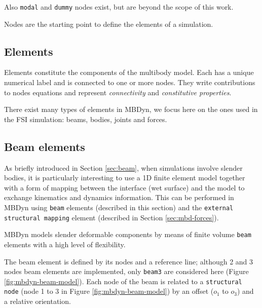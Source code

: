 Also \texttt{modal} and \texttt{dummy} nodes exist, but are beyond the scope of this work.

Nodes are the starting point to define the elements of a simulation.


\subsection{Elements}
\label{sec:mbd-elem}

Elements constitute the components of the multibody model. Each has a unique numerical label and is connected to one or more nodes. They write contributions to nodes equations and represent \textit{connectivity} and \textit{constitutive properties}.


There exist many types of elements in MBDyn, we focus here on the ones used in the FSI simulation: beams, bodies, joints and forces.



\subsection{Beam elements}
\label{sec:mbd-beam}

As briefly introduced in Section \ref{sec:beam}, when simulations involve slender bodies, it is particularly interesting to use a 1D finite element model together with a form of mapping between the interface (wet surface) and the model to exchange kinematics and dynamics information. This can be performed in MBDyn using \texttt{beam} elements (described in this section) and the \texttt{external structural mapping} element (described in Section \ref{sec:mbd-forces}).

MBDyn models slender deformable components by means of finite volume \texttt{beam} elements with a high level of flexibility.

The beam element is defined by its nodes and a reference line; although 2 and 3 nodes beam elements are implemented, only \texttt{beam3} are considered here (Figure \ref{fig:mbdyn-beam-model}). Each node of the beam is related to a \texttt{structural node} (node 1 to 3 in Figure \ref{fig:mbdyn-beam-model}) by an offset ($o_1$ to $o_3$) and a relative orientation.

